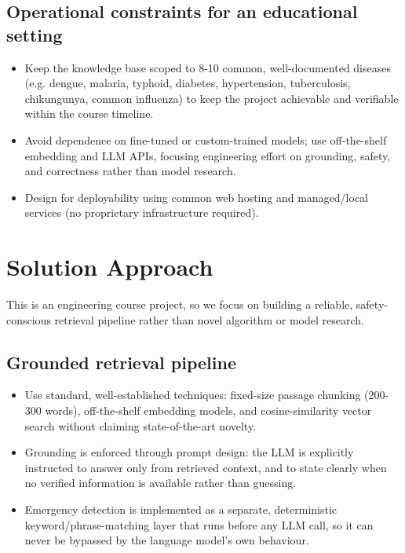 \documentclass[11pt,a4paper]{article}
\begin{document}
\subsection{Operational constraints for an educational setting}
\begin{itemize}
    \item Keep the knowledge base scoped to 8-10 common, well-documented diseases (e.g. dengue, malaria, typhoid, diabetes, hypertension, tuberculosis, chikungunya, common influenza) to keep the project achievable and verifiable within the course timeline.
    \item Avoid dependence on fine-tuned or custom-trained models; use off-the-shelf embedding and LLM APIs, focusing engineering effort on grounding, safety, and correctness rather than model research.
    \item Design for deployability using common web hosting and managed/local services (no proprietary infrastructure required).
\end{itemize}

\section{Solution Approach}
This is an engineering course project, so we focus on building a reliable, safety-conscious retrieval pipeline rather than novel algorithm or model research.

\subsection{Grounded retrieval pipeline}
\begin{itemize}
    \item Use standard, well-established techniques: fixed-size passage chunking (200-300 words), off-the-shelf embedding models, and cosine-similarity vector search without claiming state-of-the-art novelty.
    \item Grounding is enforced through prompt design: the LLM is explicitly instructed to answer only from retrieved context, and to state clearly when no verified information is available rather than guessing.
    \item Emergency detection is implemented as a separate, deterministic keyword/phrase-matching layer that runs before any LLM call, so it can never be bypassed by the language model's own behaviour.
\end{itemize}
\end{document}
